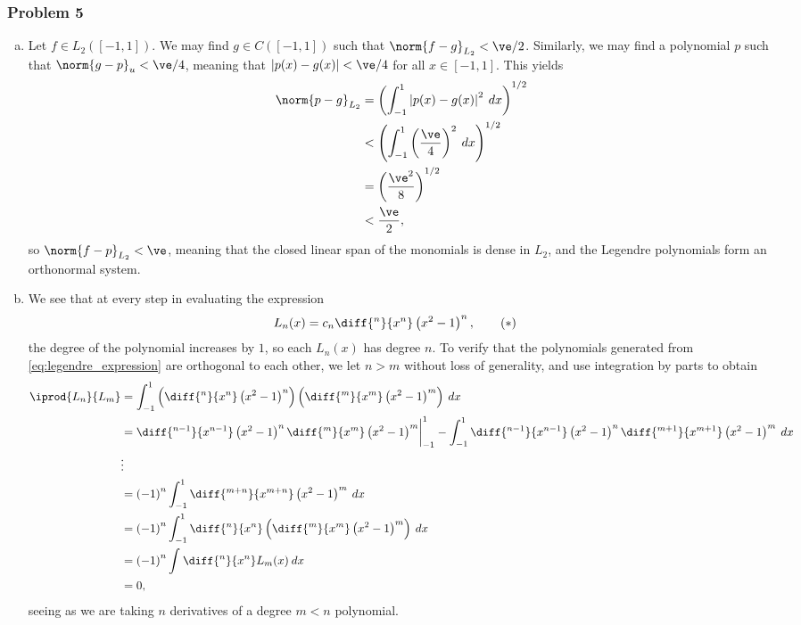 \documentclass[10pt]{mypackage}
\begin{document}
\subsubsection{Problem 5}%
\begin{enumerate}[(a)]
  \item Let $f\in L_2\left( [-1,1] \right)$. We may find $g\in C\left( [-1,1] \right)$ such that $\norm{f-g}_{L_2} < \ve/2$. Similarly, we may find a polynomial $p$ such that $\norm{g-p}_{u} < \ve/4$, meaning that $\left\vert p(x)-g(x) \right\vert < \ve/4$ for all $x\in [-1,1]$. This yields
    \begin{align*}
      \norm{p-g}_{L_2} &= \left( \int_{-1}^{1} \left\vert p(x)-g(x) \right\vert^2\:dx \right)^{1/2}\\
                       &< \left( \int_{-1}^{1} \left( \frac{\ve}{4} \right)^2\:dx \right)^{1/2}\\
                       &= \left( \frac{\ve^2}{8} \right)^{1/2}\\
                       &< \frac{\ve}{2},
    \end{align*}
    so $\norm{f-p}_{L_2} < \ve$, meaning that the closed linear span of the monomials is dense in $L_2$, and the Legendre polynomials form an orthonormal system.
  \item We see that at every step in evaluating the expression
    \begin{align*}
      L_n(x) &= c_n \diff{^{n}}{x^{n}}\left( x^2-1 \right)^{n},\label{eq:legendre_expression}\tag{$\ast$}
    \end{align*}
    the degree of the polynomial increases by $1$, so each $L_n(x)$ has degree $n$. To verify that the polynomials generated from \eqref{eq:legendre_expression} are orthogonal to each other, we let $n > m$ without loss of generality, and use integration by parts to obtain
    \begin{align*}
      \iprod{L_n}{L_m} &= \int_{-1}^{1} \left( \diff{^{n}}{x^{n}}\left( x^2-1 \right)^{n} \right) \left( \diff{^{m}}{x^{m}}\left( x^2-1 \right)^{m} \right)\:dx\\
                       &= \diff{^{n-1}}{x^{n-1}}\left( x^2-1 \right)^{n}\diff{^{m}}{x^{m}}\left( x^2-1 \right)^{m}\biggr\vert_{-1}^{1} - \int_{-1}^{1} \diff{^{n-1}}{x^{n-1}}\left( x^2-1 \right)^{n}\diff{^{m+1}}{x^{m+1}}\left( x^2-1 \right)^{m} \:dx\\
                       &\vdots\\
                       &= \left( -1 \right)^{n} \int_{-1}^{1} \diff{^{m+n}}{x^{m+n}}\left( x^2-1 \right)^{m}\:dx\\
                       &= \left( -1 \right)^{n} \int_{-1}^{1} \diff{^{n}}{x^{n}}\left( \diff{^{m}}{x^{m}}\left( x^2-1 \right)^{m} \right)\:dx\\
                       &= \left( -1 \right)^{n} \int_{}^{} \diff{^{n}}{x^{n}}L_m(x)\:dx\\
                       &= 0,
    \end{align*}
    seeing as we are taking $n$ derivatives of a degree $m < n$ polynomial.
\end{enumerate}
\end{document}
